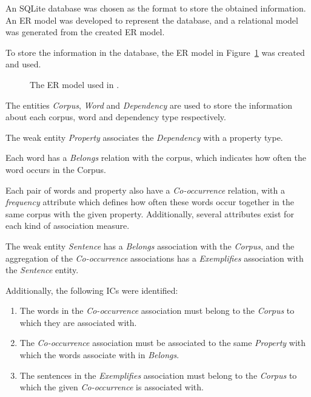 An SQLite database was chosen as the format to store the obtained information.
An \ac{ER} model was developed to represent the database, and a relational model
was generated from the created \ac{ER} model.

To store the information in the database, the \ac{ER} model in
Figure~\ref{fig:correira2015er} was created and used.

\begin{figure}[h]
 \centering
 
 \caption[ER model of (Correia et al. 2015)]{The \ac{ER} model used in
 \cite{correia2015syntax}.}
 \label{fig:correira2015er}
\end{figure}

The entities \textit{Corpus}, \textit{Word} and \textit{Dependency} are used to
store the information about each corpus, word and dependency type respectively.

The weak entity \textit{Property} associates the \textit{Dependency} with a
property type.

Each word has a \textit{Belongs} relation with the corpus, which indicates how
often the word occurs in the Corpus.

Each pair of words and property also have a \textit{Co-occurrence} relation,
with a \textit{frequency} attribute which defines how often these words occur
together in the same corpus with the given property. Additionally, several
attributes exist for each kind of association measure.

The weak entity \textit{Sentence} has a \textit{Belongs} association with the
\textit{Corpus}, and the aggregation of the \textit{Co-occurrence} associations
has a \textit{Exemplifies} association with the \textit{Sentence} entity.

Additionally, the following \acp{IC} were identified:

\begin{enumerate}
  \item The words in the \textit{Co-occurrence} association must belong to the
\textit{Corpus} to which they are associated with.
  \item The \textit{Co-occurrence} association must be associated to the same
\textit{Property} with which the words associate with in \textit{Belongs}.
  \item The sentences in the \textit{Exemplifies} association must belong to the
\textit{Corpus} to which the given \textit{Co-occurrence} is associated with.
\end{enumerate}

